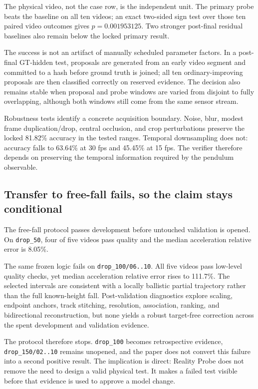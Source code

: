 \documentclass[acmtog]{acmart}
\begin{document}
The physical video, not the case row, is the independent unit. The primary probe beats the baseline on all ten videos; an exact two-sided sign test over those ten paired video outcomes gives \(p=0.001953125\). Two stronger post-final residual baselines also remain below the locked primary result.

The success is not an artifact of manually scheduled parameter factors. In a post-final GT-hidden test, proposals are generated from an early video segment and committed to a hash before ground truth is joined; all ten ordinary-improving proposals are then classified correctly on reserved evidence. The decision also remains stable when proposal and probe windows are varied from disjoint to fully overlapping, although both windows still come from the same sensor stream.

Robustness tests identify a concrete acquisition boundary. Noise, blur, modest frame duplication/drop, central occlusion, and crop perturbations preserve the locked 81.82\% accuracy in the tested ranges. Temporal downsampling does not: accuracy falls to 63.64\% at 30 fps and 45.45\% at 15 fps. The verifier therefore depends on preserving the temporal information required by the pendulum observable.

\subsection{Transfer to free-fall fails, so the claim stays conditional}\label{second-domain-iris-freefall-failure}

The free-fall protocol passes development before untouched validation is opened. On \texttt{drop\_50}, four of five videos pass quality and the median acceleration relative error is 8.05\%.

The same frozen logic fails on \texttt{drop\_100/06..10}. All five videos pass low-level quality checks, yet median acceleration relative error rises to 111.7\%. The selected intervals are consistent with a locally ballistic partial trajectory rather than the full known-height fall. Post-validation diagnostics explore scaling, endpoint anchors, track stitching, resolution, association, ranking, and bidirectional reconstruction, but none yields a robust target-free correction across the spent development and validation evidence.

The protocol therefore stops. \texttt{drop\_100} becomes retrospective evidence, \texttt{drop\_150/02..10} remains unopened, and the paper does not convert this failure into a second positive result. The implication is direct: Reality Probe does not remove the need to design a valid physical test. It makes a failed test visible before that evidence is used to approve a model change.
\end{document}
